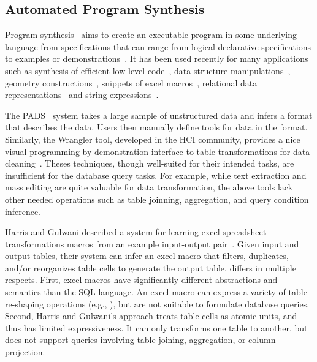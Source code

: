 
\subsection{Automated Program Synthesis }


Program synthesis~\cite{Gulwani:2010:DPS} aims to create an executable program
in some underlying language from specifications that can range
from logical declarative specifications to examples or
demonstrations~\cite{Harris:2011, singh:2012, Gulwani:2011,
Kandel:2011, Fisher08Pads,Lau:2003:PDU, Lau:2000:VSA, Barbosa:2010:MLA, Arasu:2009:LST}.
It has been used recently for many applications
such as synthesis of efficient low-level code~\cite{Solar-Lezama:2005},
data structure manipulations~\cite{Fisher:2008},
geometry constructions~\cite{Gulwani:2011:SGC},
snippets of excel macros~\cite{Harris:2011},
relational data representations~\cite{Barbosa:2010:MLA, Arasu:2009:LST} and string
expressions~\cite{singh:2012, Gulwani:2011}.


The PADS~\cite{Fisher:2008} system takes a large sample
of unstructured data and infers a
format that describes the data. Users then manually
define tools for data in the format.
Similarly, the Wrangler tool, developed in the HCI community,
provides a nice visual programming-by-demonstration
interface to table transformations for data cleaning~\cite{Kandel:2011}.
Theses techniques, though well-suited for their intended tasks,
are insufficient for the database query tasks.
For example, while text extraction and mass editing
are quite valuable for data transformation, the above tools
lack other needed operations such as table joinning,
aggregation, and query condition inference.


Harris and Gulwani described a system for learning excel
spreadsheet transformations macros from an example
input-output pair~\cite{Harris:2011}. Given input and output
tables, their system can infer an excel macro that filters,
duplicates, and/or reorganizes table cells to generate the output table.
\ourtool differs in multiple respects.
First, excel macros have significantly different
abstractions and semantics than the SQL language.
An excel macro can express a variety of table re-shaping operations
(e.g., ), but
are not suitable to formulate database queries.
Second, Harris and Gulwani's approach treats table cells
as atomic units, and thus has limited expressiveness.
It can only transforms one table to another, but
does not support queries involving table joining, aggregation,
or column projection. 


